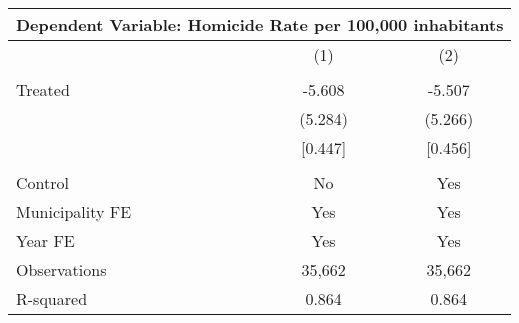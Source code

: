 \documentclass[]{article}
\begin{document}
\begin{table}[!htbp]
\centering
\begin{tabular}{lcc}
\toprule
\multicolumn{3}{c}{Dependent Variable: Homicide Rate per 100,000 inhabitants} \\
\hline
 & (1) & (2) \\
\hline
 & & \\
Treated & -5.608 & -5.507 \\
 & (5.284) & (5.266) \\
 & [0.447] & [0.456] \\\\
 \midrule
Control & No & Yes \\
Municipality FE & Yes & Yes \\
Year FE & Yes & Yes \\
Observations & 35,662 & 35,662 \\
R-squared & 0.864 & 0.864 \\
\hline
\end{tabular}
\end{table}
\end{document}
